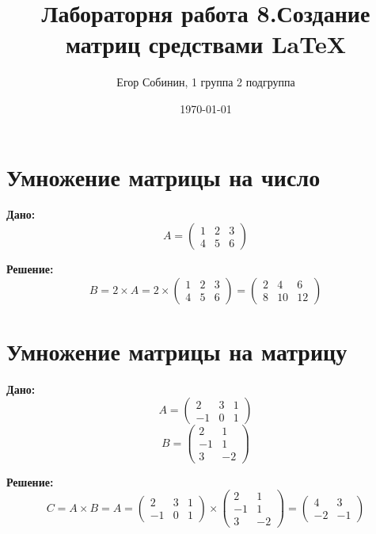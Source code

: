 \documentclass[a4paper,12pt]{article} %
\author{Егор Собинин, 1 группа 2 подгруппа}
\title{Лабораторня работа 8.Создание матриц средствами LaTeX}
\date{\today}
\begin{document}
\maketitle
\newpage

\section{Умножение матрицы на число}

\textbf{Дано:}
\begin{equation*}
A = \left(
\begin{array}{ccc}
1 & 2 & 3\\
4 & 5 & 6 
\end{array}
\right)
\end{equation*}

\textbf{Решение:}
\begin{equation*}
B = 2 \times A = 2 \times \left(
\begin{array}{ccc}
1 & 2 & 3\\
4 & 5 & 6 
\end{array}
\right) = \left(
\begin{array}{ccc}
2 & 4 & 6\\
8 & 10 & 12 
\end{array}
\right)
\end{equation*}

\section{Умножение матрицы на матрицу}

\textbf{Дано:}
\begin{equation*}
A = \left(
\begin{array}{ccc}
2 & 3 & 1\\
-1 & 0 & 1 
\end{array}
\right)
\end{equation*}
\begin{equation*}
B = \left(
\begin{array}{cc}
2 & 1\\
-1 & 1\\
3 & -2
\end{array}
\right)
\end{equation*}

\textbf{Решение:}
\begin{equation*}
    C = A \times B = A = \left(
\begin{array}{ccc}
2 & 3 & 1\\
-1 & 0 & 1 
\end{array}
\right) \times \left(
\begin{array}{cc}
2 & 1\\
-1 & 1\\
3 & -2
\end{array}
\right) = \left(
\begin{array}{cc}
4 & 3\\
-2 & -1
\end{array}
\right)
\end{equation*}
\end{document}
